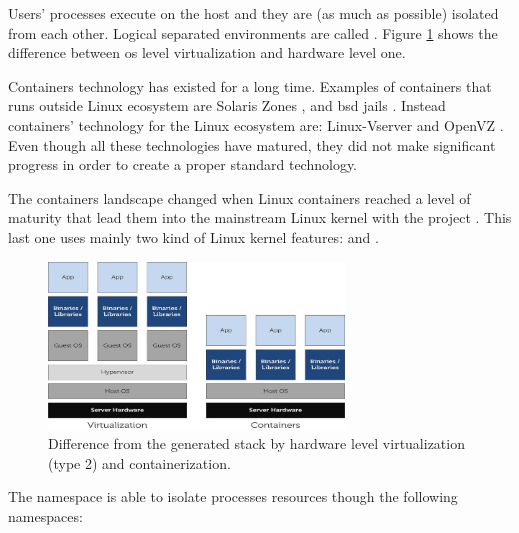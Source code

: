 Users' processes execute on the host and they are (as much as possible) isolated from each other.
Logical separated environments are called .
Figure \ref{img:background-paas-virtualization-assets-virtualizationTypeDifference} shows the
difference between \acs{os} level virtualization and hardware level one.

Containers technology has existed for a long time. Examples of containers that runs outside Linux
ecosystem are Solaris Zones \cite{solarisContainers}, and \acs{bsd} jails \cite{bsdContainers}.
Instead containers' technology for the Linux ecosystem are: Linux-Vserver \cite{vserverContainers}
and OpenVZ \cite{openvzContainers}. Even though all these technologies have matured, they did not make
significant progress in order to create a proper standard technology.

The containers landscape changed when Linux containers reached a level of maturity that lead them 
into the mainstream Linux kernel with the project . This last one uses mainly two
kind of Linux kernel features:  and .

\begin{figure}[h!]
	\centering{}
	\includegraphics[width=0.7\textwidth]{chapters/background/images/containerization.png}
	\caption[Difference from containerization and virtualization]{Difference from the generated stack
		by hardware level virtualization (type 2) and containerization.}
	\label{img:background-paas-virtualization-assets-virtualizationTypeDifference}
\end{figure}

The namespace is able to isolate processes resources though the following namespaces:

